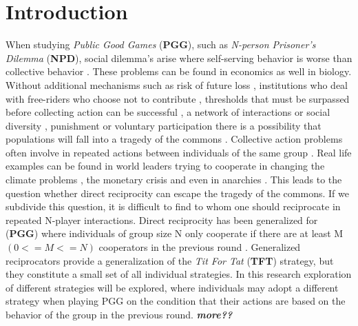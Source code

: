 \documentclass[letterpaper]{article}
\begin{document}
\section{Introduction}
When studying \textit{Public Good Games}  (\textbf{PGG}), such as \textit{N-person Prisoner's Dilemma}  (\textbf{NPD}), social dilemma's arise where self-serving behavior is worse than collective behavior \citep{kollock1998social}. These problems can be found in economics as well in biology.
Without additional mechanisms such as risk of future loss \citep{santos2011risk}, institutions who deal with free-riders who choose not to contribute \citep{vasconcelos2013bottom,sigmund2010social}, thresholds that must be surpassed before collecting action can be successful \citep{pacheco2011evolutionary}, a network of interactions or social diversity \citep{wang2013interdependent,santos2008social}, punishment \citep{fehr2002altruistic,brandt2006punishing} or voluntary participation \citep{hauert2002volunteering} there is a possibility that populations will fall into a tragedy of the commons \citep{hardin1968tragedy}.
Collective action problems often involve in repeated actions between individuals of the same group \citep{boyd1988evolution}. Real life examples can be found in world leaders trying to cooperate in changing the climate problems \citep{milinski2008collective,barrett2012climate}, the monetary crisis \citep{jacquet2001economic} and even in anarchies \citep{axelrod1985achieving}. This leads to the question whether direct reciprocity can escape the tragedy of the commons. If we subdivide this question, it is difficult to find to whom one should reciprocate in repeated N-player interactions. Direct reciprocity has been generalized for (\textbf{PGG}) where individuals of group size N only cooperate if there are at least M $(0<=M<=N)$ cooperators in the previous round \citep{van2012emergence,kurokawa2009emergence}. Generalized reciprocators provide a generalization of the \textit{Tit For Tat}  (\textbf{TFT}) strategy, but they constitute a small set of all individual strategies.
In this research exploration of different strategies will be explored, where individuals may adopt a different strategy when playing PGG on the condition that their actions are based on the behavior of the group in the previous round.
\textit{\textbf{more??}}
\end{document}
